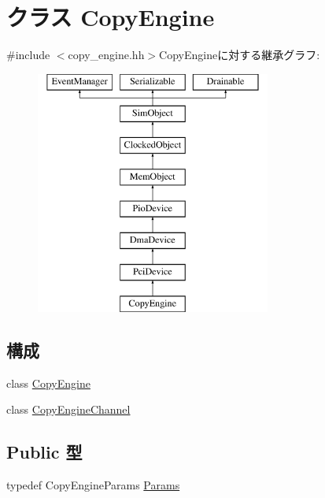 \hypertarget{classCopyEngine}{
\section{クラス CopyEngine}
\label{classCopyEngine}
}


{\ttfamily \#include $<$copy\_\-engine.hh$>$}CopyEngineに対する継承グラフ:\begin{figure}[H]
\begin{center}
\leavevmode
\includegraphics[height=8cm]{classCopyEngine}
\end{center}
\end{figure}
\subsection*{構成}
\begin{DoxyCompactItemize}
\item 
class \hyperlink{classCopyEngine_1_1CopyEngine}{CopyEngine}
\item 
class \hyperlink{classCopyEngine_1_1CopyEngineChannel}{CopyEngineChannel}
\end{DoxyCompactItemize}
\subsection*{Public 型}
\begin{DoxyCompactItemize}
\item 
typedef CopyEngineParams \hyperlink{classCopyEngine_a0b0580d58d6a0384646682653aefb97a}{Params}
\end{DoxyCompactItemize}
